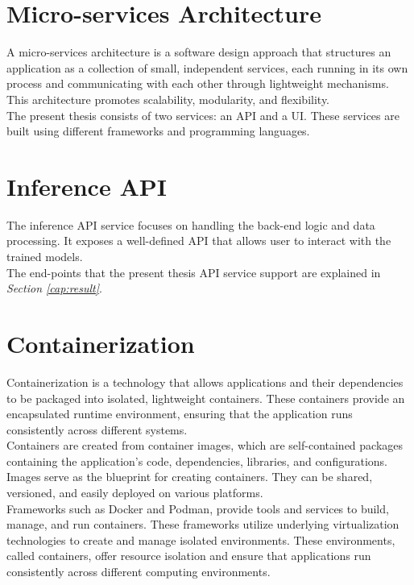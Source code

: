 \section{Micro-services Architecture}

A micro-services architecture is a software design approach that structures an application as a collection of small, independent services, each running in its own process and communicating with each other through lightweight mechanisms. This architecture promotes scalability, modularity, and flexibility. \\

The present thesis consists of two services: an API and a UI. These services are built using different frameworks and programming languages.


\section{Inference API}

The inference API service focuses on handling the back-end logic and data processing.
It exposes a well-defined API that allows user to interact with the trained models. \\

The end-points that the present thesis API service support are explained in \textit{Section \ref{cap:result}}.

\section{Containerization}

Containerization is a technology that allows applications and their dependencies to be packaged into isolated, lightweight containers. These containers provide an encapsulated runtime environment, ensuring that the application runs consistently across different systems. \\

Containers are created from container images, which are self-contained packages containing the application's code, dependencies, libraries, and configurations. Images serve as the blueprint for creating containers. They can be shared, versioned, and easily deployed on various platforms. \\

Frameworks such as Docker and Podman, provide tools and services to build, manage, and run containers. These frameworks utilize underlying virtualization technologies to create and manage isolated environments. These environments, called containers, offer resource isolation and ensure that applications run consistently across different computing environments.

